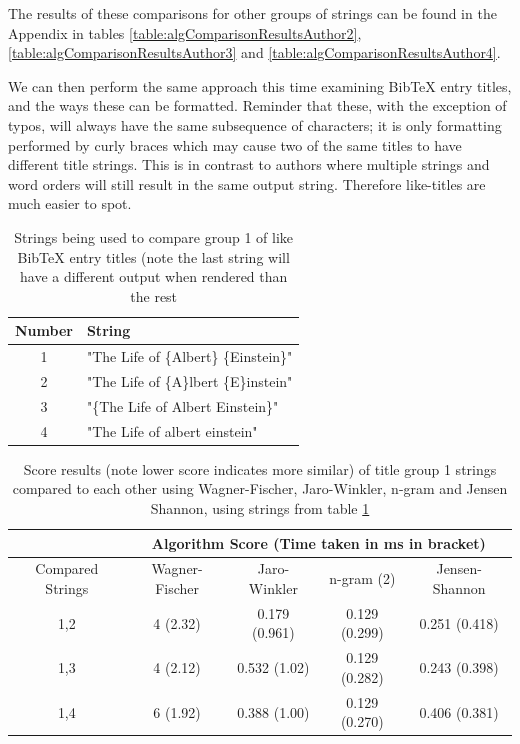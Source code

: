 \documentclass[a4paper,11pt]{article}
\begin{document}
The results of these comparisons for other groups of strings can be found in the Appendix in tables \ref{table:algComparisonResultsAuthor2}, \ref{table:algComparisonResultsAuthor3} and  \ref{table:algComparisonResultsAuthor4}.

We can then perform the same approach this time examining BibTeX entry titles, and the ways these can be formatted. Reminder that these, with the exception of typos, will always have the same subsequence of characters; it is only formatting performed by curly braces which may cause two of the same titles to have different title strings. This is in contrast to authors where multiple strings and word orders will still result in the same output string. Therefore like-titles are much easier to spot.

\begin{table}[H]
      \centering
      \begin{tabular}{|c|p{}|}
      \hline
           Number &  String \\ \hline \hline
           1 & "The Life of \{Albert\} \{Einstein\}" \\ \hline
           2 & "The Life of \{A\}lbert \{E\}instein" \\ \hline
           3 & "\{The Life of Albert Einstein\}" \\ \hline
           4 & "The Life of albert einstein" \\
           \hline
      \end{tabular}
  \caption{Strings being used to compare group 1 of like BibTeX entry titles (note the last string will have a different output when rendered than the rest}
\label{table:titleGroup1Strings}
\end{table}
    \begin{table}[H]
    \centering
       \begin{tabular}{|c|c|c|c|c|}
    \hline
     & \multicolumn{4}{c|}{Algorithm Score (Time taken in ms in bracket)}\\
     \hline
     Compared Strings  & Wagner-Fischer & Jaro-Winkler & n-gram (2) & Jensen-Shannon \\
     \hline \hline
    1,2 & 4 (2.32) & 0.179 (0.961)& 0.129 (0.299) & 0.251 (0.418) \\
             \hline
    1,3 & 4 (2.12) & 0.532 (1.02) & 0.129 (0.282) & 0.243 (0.398) \\
    \hline
    1,4 & 6 (1.92) & 0.388 (1.00)& 0.129 (0.270) & 0.406 (0.381) \\
    \hline
    \end{tabular}
    \caption{Score results (note lower score indicates more similar) of title group 1 strings compared to each other using Wagner-Fischer, Jaro-Winkler, n-gram and Jensen Shannon, using strings from table \ref{table:titleGroup1Strings}}
\label{table:algComparisonResultsTitle}
\end{table}
\end{document}
